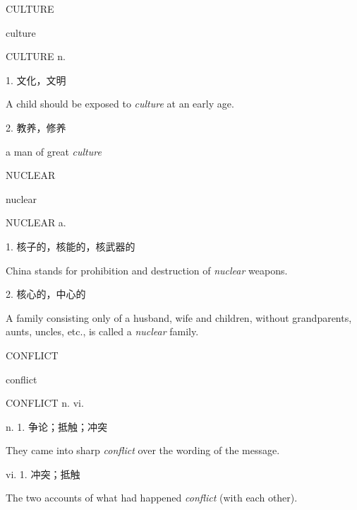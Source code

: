 \begin{flashcard}{
CULTURE

culture
}
\begin{center}
CULTURE n. 
\end{center}
1. 文化，文明

A child should be exposed to \textit{culture} at an early age.

2. 教养，修养

a man of great \textit{culture}

\end{flashcard}
\begin{flashcard}{
NUCLEAR

nuclear
}
\begin{center}
NUCLEAR a. 
\end{center}
1. 核子的，核能的，核武器的

China stands for prohibition and destruction of \textit{nuclear} weapons.

2. 核心的，中心的

A family consisting only of a husband, wife and children, without grandparents, aunts, uncles, etc., is called a \textit{nuclear} family.

\end{flashcard}
\begin{flashcard}{
CONFLICT

conflict
}
\begin{center}
CONFLICT n.  vi. 
\end{center}
n. 1. 争论；抵触；冲突

They came into sharp \textit{conflict} over the wording of the message.

vi. 1. 冲突；抵触

The two accounts of what had happened \textit{conflict} (with each other).

\end{flashcard}
